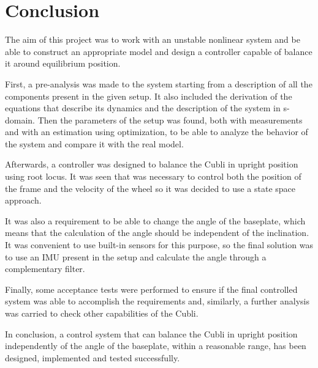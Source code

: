 \chapter{Conclusion}

The aim of this project was to work with an unstable nonlinear system and be able to construct an appropriate model and design a controller capable of balance it around equilibrium position.

First, a pre-analysis was made to the system starting from a description of all the components present in the given setup. It also included the derivation of the equations that describe its dynamics and the description of the system in s-domain. Then the parameters of the setup was found, both with measurements and with an estimation using optimization, to be able to analyze the behavior of the system and compare it with the real model.

Afterwards, a controller was designed to balance the Cubli in upright position using root locus. It was seen that was necessary to control both the position of the frame and the velocity of the wheel so it was decided to use a state space approach.

It was also a requirement to be able to change the angle of the baseplate, which means that the calculation of the angle should be independent of the inclination. It was convenient to use built-in sensors for this purpose, so the final solution was to use an IMU present in the setup and calculate the angle through a complementary filter.

Finally, some acceptance tests were performed to ensure if the final controlled system was able to accomplish the requirements and, similarly, a further analysis was carried to check other capabilities of the Cubli.

In conclusion, a control system that can balance the Cubli in upright position independently of the angle of the baseplate, within a reasonable range, has been designed, implemented and tested successfully.
